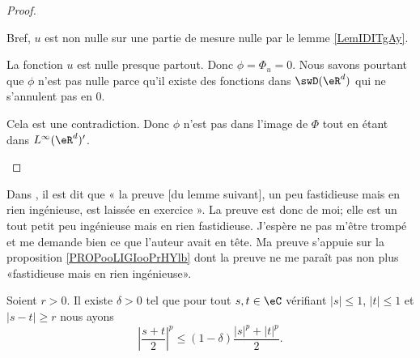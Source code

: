 \begin{proof}
\begin{subproof}
		Bref, \( u\) est non nulle sur une partie de mesure nulle par le lemme \ref{LemIDITgAy}.

		\spitem[Conclusion]

		La fonction \( u\) est nulle presque partout. Donc \( \phi=\Phi_u=0\). Nous savons pourtant que \( \phi\) n'est pas nulle parce qu'il existe des fonctions dans \( \swD(\eR^d)\) qui ne s'annulent pas en \( 0\).

		Cela est une contradiction. Donc \( \phi\) n'est pas dans l'image de \( \Phi\) tout en étant dans \( L^{\infty}(\eR^d)'\).

	\end{subproof}
\end{proof}

Dans \cite{ooHGADooNGZnbt}, il est dit que « la preuve [du lemme suivant], un peu fastidieuse mais en rien ingénieuse, est laissée en exercice ». La preuve est donc de moi; elle est un tout petit peu ingénieuse mais en rien fastidieuse. J'espère ne pas m'être trompé et me demande bien ce que l'auteur avait en tête. Ma preuve s'appuie sur la proposition \ref{PROPooLIGIooPrHYlb} dont la preuve ne me paraît pas non plus «fastidieuse mais en rien ingénieuse».

\begin{lemma}        \label{LEMooLDQRooEGWDlm}
	Soient \( r>0\). Il existe \( \delta>0\) tel que pour tout \( s,t\in \eC\) vérifiant \( | s |\leq 1\), \( | t |\leq 1\) et \( | s-t |\geq r\) nous ayons
	\begin{equation}
		\left| \frac{ s+t }{ 2 } \right|^p\leq (1-\delta)\frac{ | s |^p+| t |^p }{2}.
	\end{equation}
\end{lemma}

